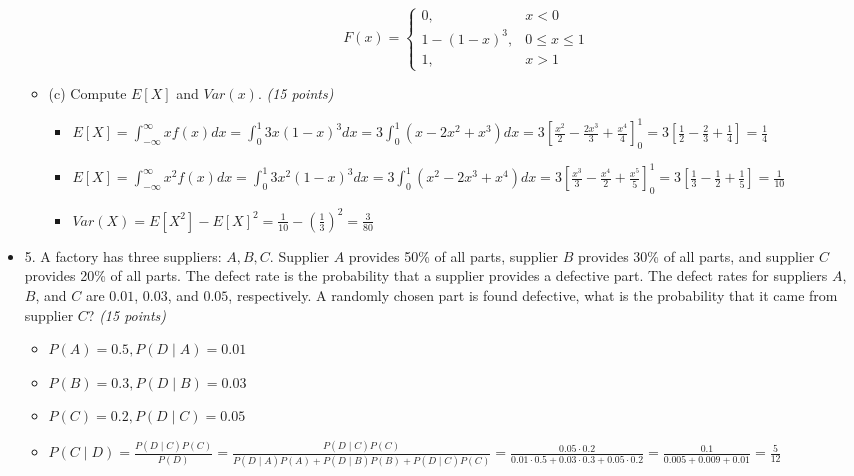 \documentclass{article}
\begin{document}
\begin{itemize}
\begin{itemize}
\begin{itemize}
            \[
            F(x) = \left\{ \begin{array}{rl}
                0, & x < 0 \\
                1-(1-x)^3, & 0 \le x \le 1 \\
                1, & x > 1
            \end{array} \right.
            \]
        \end{itemize}
        \item (c) Compute $E[X]$ and $Var(x)$. \textit{(15 points)}
        \begin{itemize}
            \item $E[X] = \int_{-\infty}^\infty xf(x)dx = \int_0^1 3x(1-x)^3 dx = 3 \int_0^1 (x-2x^2+x^3)dx = 3\left[ \frac{x^2}{2} - \frac{2x^3}{3} + \frac{x^4}{4} \right]_0^1 = 3 \left[\frac{1}{2} - \frac{2}{3} + \frac{1}{4} \right] = \frac{1}{4}$
            \item $E[X] = \int_{-\infty}^\infty x^2f(x)dx = \int_0^1 3x^2(1-x)^3 dx = 3 \int_0^1 (x^2-2x^3+x^4)dx = 3\left[ \frac{x^3}{3} - \frac{x^4}{2} + \frac{x^5}{5} \right]_0^1 = 3 \left[\frac{1}{3} - \frac{1}{2} + \frac{1}{5} \right] = \frac{1}{10}$
            \item $Var(X) = E[X^2] - E[X]^2 = \frac{1}{10} - \left( \frac{1}{3} \right)^2 = \frac{3}{80}$
        \end{itemize}
    \end{itemize}
    \item 5. A factory has three suppliers: $A,B,C$. Supplier $A$ provides 50\% of all parts, supplier $B$ provides 30\% of all parts, and supplier $C$ provides 20\% of all parts. The defect rate is the probability that a supplier provides a defective part. The defect rates for suppliers $A$, $B$, and $C$ are $0.01$, $0.03$, and $0.05$, respectively. A randomly chosen part is found defective, what is the probability that it came from supplier $C$? \textit{(15 points)}
    \begin{itemize}
        \item $P(A) = 0.5, P(D \mid A)= 0.01$
        \item $P(B) = 0.3, P(D \mid B) = 0.03$
        \item $P(C) = 0.2, P(D \mid C) = 0.05$
        \item $P(C \mid D) = \frac{P(D \mid C) P(C)}{P(D)} = \frac{P(D \mid C)P(C)}{P(D \mid A)P(A) + P(D \mid B)P(B) + P(D \mid C)P(C)} = \frac{0.05 \cdot 0.2}{0.01 \cdot 0.5 + 0.03 \cdot 0.3 + 0.05 \cdot 0.2} = \frac{0.1}{0.005+0.009+0.01} = \frac{5}{12}$
    \end{itemize}
\end{itemize}
\end{document}
